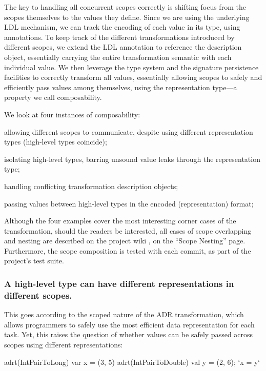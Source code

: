The key to handling all concurrent scopes correctly is shifting focus from the scopes themselves to the values they define. Since we are using the underlying LDL mechanism, we can track the encoding of each value in its type, using annotations. To keep track of the different transformations introduced by different scopes, we extend the LDL annotation to reference the description object, essentially carrying the entire transformation semantic with each individual value. We then leverage the type system and the signature persistence facilities to correctly transform all values, essentially allowing scopes to safely and efficiently pass values among themselves, using the representation type---a property we call composability.

We look at four instances of composability:

\begin{compactitem}
  \item allowing different scopes to communicate, despite using different representation types (high-level types coincide);
  \item isolating high-level types, barring unsound value leaks through the representation type;
  \item handling conflicting transformation description objects;
  \item passing values between high-level types in the encoded (representation) format;
\end{compactitem}

Although the four examples cover the most interesting corner cases of the transformation, should the readers be interested, all cases of scope overlapping and nesting are described on the project wiki \cite{ildl-plugin-wiki}, on the ``Scope Nesting'' page. Furthermore, the scope composition is tested with each commit, as part of the project's test suite.

\subsubsection{A high-level type can have different representations in different scopes.} This goes according to the scoped nature of the ADR transformation, which allows programmers to safely use the most efficient data representation for each task. Yet, this raises the question of whether values can be safely passed across scopes using different representations:

\begin{lstlisting-nobreak}
adrt(IntPairToLong)   { var x = (3, 5) }
adrt(IntPairToDouble) { val y = (2, 6); `x = y` }
\end{lstlisting-nobreak}

